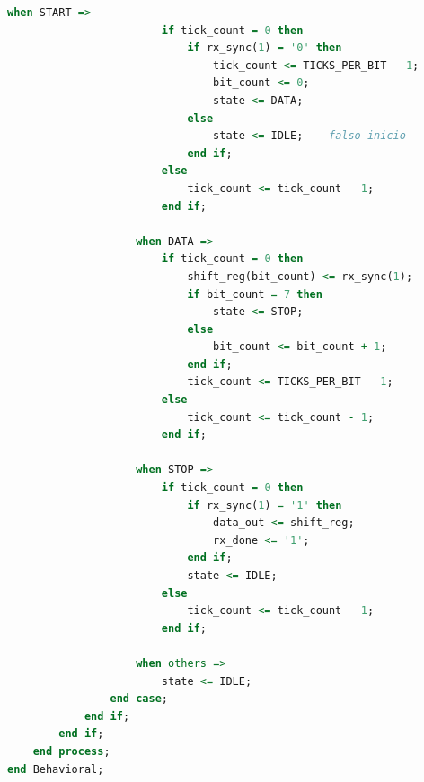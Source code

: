 \documentclass[a4paper,12pt]{article}
\begin{document}
\begin{lstlisting}[language=VHDL, caption={Código completo del módulo UART\_RX}, label={lst:uart_rx}]
                    when START =>
                        if tick_count = 0 then
                            if rx_sync(1) = '0' then
                                tick_count <= TICKS_PER_BIT - 1;
                                bit_count <= 0;
                                state <= DATA;
                            else
                                state <= IDLE; -- falso inicio
                            end if;
                        else
                            tick_count <= tick_count - 1;
                        end if;

                    when DATA =>
                        if tick_count = 0 then
                            shift_reg(bit_count) <= rx_sync(1);
                            if bit_count = 7 then
                                state <= STOP;
                            else
                                bit_count <= bit_count + 1;
                            end if;
                            tick_count <= TICKS_PER_BIT - 1;
                        else
                            tick_count <= tick_count - 1;
                        end if;

                    when STOP =>
                        if tick_count = 0 then
                            if rx_sync(1) = '1' then
                                data_out <= shift_reg;
                                rx_done <= '1';
                            end if;
                            state <= IDLE;
                        else
                            tick_count <= tick_count - 1;
                        end if;

                    when others =>
                        state <= IDLE;
                end case;
            end if;
        end if;
    end process;
end Behavioral;
\end{lstlisting}

\newpage
\end{document}
